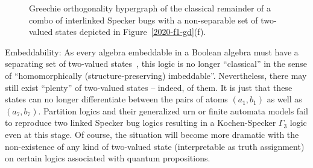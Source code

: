 \begin{figure}
\begin{center}
\end{center}
\caption{\label{2020-f-clr-SpeckerBugCombo}
Greechie orthogonality hypergraph of the classical remainder of
a combo of interlinked Specker bugs with a non-separable set of two-valued states
depicted in Figure~\ref{2020-f1-gd}(f).
}
\end{figure}

Embeddability: As every algebra embeddable in a Boolean algebra must have a separating set of two-valued states~\cite[Theorem~0]{kochen1},
this logic is no longer ``classical''
in the sense of ``homomorphically (structure-preserving) imbeddable''.
Nevertheless, there may still exist ``plenty'' of two-valued states --
indeed,
of them. It is just that these states can no longer differentiate
between the pairs of atoms $(a_1,b_1)$ as well as $(a_7,b_7)$.
Partition logics and their generalized urn or finite automata models fail to reproduce
two linked Specker bug logics resulting in a Kochen-Specker $\Gamma_3$ logic even at this stage.
Of course, the situation will become more dramatic with the non-existence of any kind of two-valued state
(interpretable as truth assignment) on certain logics associated with quantum propositions.




